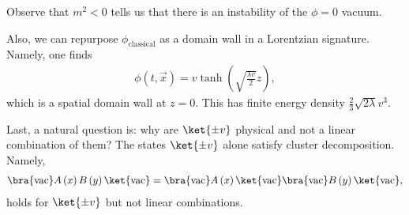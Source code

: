 \begin{note}
    Observe that $m^2 < 0$ tells us that there is an instability of the $\phi = 0$ vacuum. 

    Also, we can repurpose $\phi_\text{classical}$ as a domain wall in a Lorentzian signature. Namely, one finds
    \begin{align}
        \phi \left( t, \vec{x} \right) = v \tanh \left( \sqrt{\frac{\lambda v}{2}}  z\right) 
    ,\end{align}
    which is a spatial domain wall at $z = 0$. This has finite energy density $\frac{2}{3}\sqrt{2\lambda} v^3$.

    Last, a natural question is: why are $\ket{\pm v}$ physical and not a linear combination of them? The states $\ket{\pm v}$ alone satisfy cluster decomposition. Namely,
    \begin{align}
        \bra{\text{vac}} A\left( x \right) B\left( y \right) \ket{\text{vac}} =  \bra{\text{vac}} A \left( x \right) \ket{\text{vac}} \bra{\text{vac}} B\left( y \right) \ket{\text{vac}}
    ,\end{align}
    holds for $\ket{\pm v}$ but not linear combinations.
\end{note}







